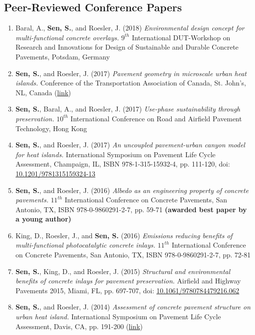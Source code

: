 \documentclass[12pt]{article}
\begin{document}
\subsection*{Peer-Reviewed Conference Papers}
\begin{enumerate}[label=(C\arabic*)]
	\item Baral, A., \textbf{Sen, S.}, and Roesler, J. (2018) \textit{Environmental design concept for multi-functional concrete overlays.} $9^{th}$ International DUT-Workshop on Research and Innovations for Design of Sustainable and Durable Concrete Pavements, Potsdam, Germany
	\item \textbf{Sen, S.}, and Roesler, J. (2017) \textit{Pavement geometry in microscale urban heat islands.} Conference of the Transportation Association of Canada, St. John’s, NL, Canada (\href{http://www.tac-atc.ca/sites/default/files/conf_papers/sens_-_pavement_geometry_in_microscale_urban_heat_islands.pdf}{link})
	\item \textbf{Sen, S.}, Baral, A., and Roesler, J. (2017) \textit{Use-phase sustainability through preservation.} $10^{th}$ International Conference on Road and Airfield Pavement Technology, Hong Kong
	\item \textbf{Sen, S.}, and Roesler, J. (2017) \textit{An uncoupled pavement-urban canyon model for heat islands.} International Symposium on Pavement Life Cycle Assessment, Champaign, IL, ISBN 978-1-315-15932-4, pp. 111-120, doi: \href{http://dx.doi.org/10.1201/9781315159324-13}{10.1201/9781315159324-13}
	\item \textbf{Sen, S.}, and Roesler, J. (2016) \textit{Albedo as an engineering property of concrete pavements.} $11^{th}$ International Conference on Concrete Pavements, San Antonio, TX, ISBN 978-0-9860291-2-7, pp. 59-71 \textbf{(awarded best paper by a young author)}
	\item King, D., Roesler, J., and \textbf{Sen, S.} (2016) \textit{Emissions reducing benefits of multi-functional photocatalytic concrete inlays.} $11^{th}$ International Conference on Concrete Pavements, San Antonio, TX, ISBN 978-0-9860291-2-7, pp. 72-81
	\item \textbf{Sen, S.}, King, D., and Roesler, J. (2015) \textit{Structural and environmental benefits of concrete inlays for pavement preservation.} Airfield and Highway Pavements 2015, Miami, FL, pp. 697-707, doi: \href{http://dx.doi.org/10.1061/9780784479216.062}{10.1061/9780784479216.062}
	\item \textbf{Sen, S.}, and Roesler, J. (2014) \textit{Assessment of concrete pavement structure on urban heat island.} International Symposium on Pavement Life Cycle Assessment, Davis, CA, pp. 191-200 (\href{http://www.ucprc.ucdavis.edu/p-LCA2014/media/pdf/Papers/LCA14_Urban\%20Heat\%20Island.pdf}{link})
\end{enumerate}
\end{document}
